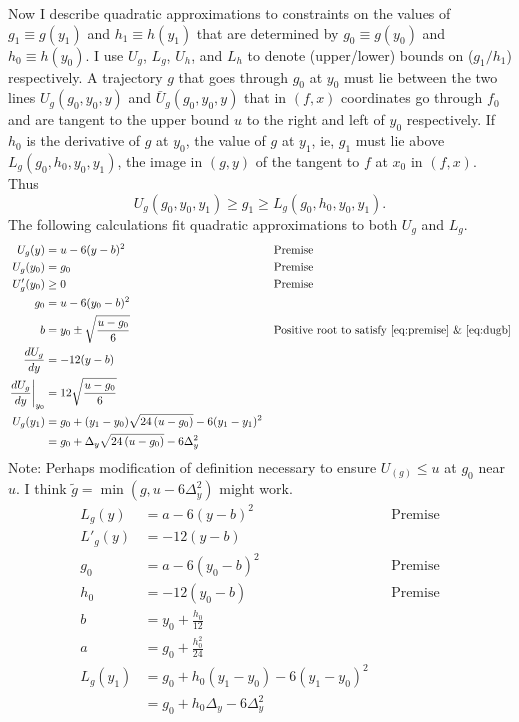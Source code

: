 \documentclass[]{article}
\begin{document}
Now I describe quadratic approximations to constraints on the values
of $g_1 \equiv g(y_1)$ and $h_1 \equiv h(y_1)$ that are determined by
$g_0 \equiv g(y_0)$ and $h_0 \equiv h(y_0)$.  I use $U_g$, $L_g$,
$U_h$, and $L_h$ to denote (upper/lower) bounds on ($g_1/h_1$)
respectively.  A trajectory $g$ that goes through $g_0$ at $y_0$ must
lie between the two lines $U_g(g_0,y_0,y)$ and $\bar U_g(g_0,y_0,y)$
that in $(f,x)$ coordinates go through $f_0$ and are tangent to the
upper bound $u$ to the right and left of $y_0$ respectively.  If $h_0$
is the derivative of $g$ at $y_0$, the value of $g$ at $y_1$, ie,
$g_1$ must lie above $L_g(g_0,h_0,y_0, y_1)$, the image in $(g,y)$ of
the tangent to $f$ at $x_0$ in $(f,x)$.  Thus
\begin{equation}
  \label{eq:boundsA}
  U_g(g_0,y_0, y_1) \geq g_1 \geq L_g(g_0,h_0,y_0, y_1).
\end{equation}
The following calculations fit quadratic approximations to both $U_g$
and $L_g$.
\newcommand{\Rad}[1]{\sqrt{24\left(u#1\right)}}
\newcommand{\UgQ}{ g_0 + \Delta_y\Rad{-g_0} - 6 \Delta_y^2}
\begin{align}
  U_g(y) &= u - 6(y-b)^2 &&\text{Premise} \nonumber \\
  U_g(y_0) &= g_0 &&\text{Premise} \nonumber \\
  \label{eq:premise}
  U'_g(y_0) &\geq 0 &&\text{Premise} \\
  g_0 &= u - 6(y_0-b)^2 \nonumber \\
  b &= y_0 \pm \sqrt{\frac{u-g_0}{6}} && \text{Positive root to satisfy
    \eqref{eq:premise} \& \eqref{eq:dugb}}  \nonumber \\
  \label{eq:dugb}
  \frac{d U_g}{d y} &= -12(y-b) \\
  \label{eq:dug}
  \left. \frac{d U_g}{d y} \right|_{y_0} &= 12\sqrt{\frac{u-g_0}{6}} \\
  U_g(y_1) &= g_0 + (y_1-y_0)\Rad{-g_0} - 6 (y_1-y_1)^2
  \nonumber \\
  &= \UgQ \nonumber
\end{align}
Note: Perhaps modification of definition necessary to ensure $U_(g)
\leq u$ at $g_0$ near $u$.  I think $\tilde g = \min(g,u-6\Delta_y^2)$
might work. %
\newcommand{\LgQ}{g_0 + h_0\Delta_y - 6\Delta_y^2}
\begin{align*}
  L_g(y) &= a - 6(y-b)^2 &&\text{Premise} \nonumber \\
  L'_g(y) &= -12(y-b) \nonumber \\
  g_0 &= a - 6(y_0-b)^2 &&\text{Premise} \nonumber \\
  h_0 &= -12(y_0-b) &&\text{Premise} \nonumber \\
  b &= y_0 + \frac{h_0}{12} \nonumber \\
  a &= g_0 + \frac{h^2_0}{24} \\
  L_g(y_1) &= g_0 + h_0(y_1-y_0) -6(y_1-y_0)^2 \nonumber
  \\
  &= \LgQ \nonumber
\end{align*}
\end{document}
